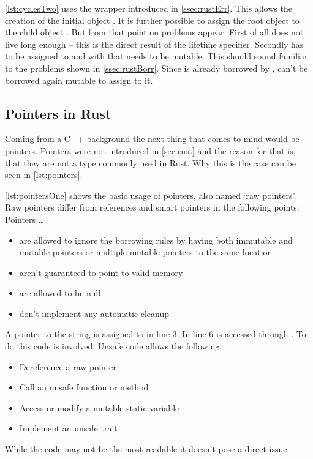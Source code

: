 \documentclass[thesis]{subfiles}
\begin{document}
    \autoref{lst:cyclesTwo} uses the  wrapper introduced in \autoref{ssec:rustErr}.
    This allows the creation of the initial \Node object .
    It is further possible to assign the root object  to the child object .
    But from that point on problems appear.
    First of all does  not live long enough -- this is the direct result of the lifetime specifier.
    Secondly has  to be assigned to  and with that needs  to be mutable.
    This should sound familiar to the problems shown in \autoref{ssec:rustBorr}.
    Since  is already borrowed by ,  can't be borrowed again mutable to assign  to it.

  \subsection{Pointers in Rust}
    Coming from a C++ background the next thing that comes to mind would be pointers.
    Pointers were not introduced in \autoref{sec:rust} and the reason for that is, that they are not a type commonly used in Rust.
    Why this is the case can be seen in \autoref{lst:pointers}.

    \autoref{lst:pointersOne} shows the basic usage of pointers, also named `raw pointers'.
    Raw pointers differ from references and smart pointers in the following points\autocite{rust-book}: Pointers \ldots
    \begin{itemize}
      \item are allowed to ignore the borrowing rules by having both immutable and mutable pointers or multiple mutable pointers to the same location
      \item aren't guaranteed to point to valid memory
      \item are allowed to be null
      \item don’t implement any automatic cleanup
    \end{itemize}
    A pointer to the string  is assigned to  in line 3.
    In line 6  is accessed through .
    To do this  code is involved.
    Unsafe code allows the following\autocite{rust-book}:
    \begin{itemize}
      \item Dereference a raw pointer
      \item Call an unsafe function or method
      \item Access or modify a mutable static variable
      \item Implement an unsafe trait
    \end{itemize}
    While the code may not be the most readable it doesn't pose a direct issue.
\end{document}
